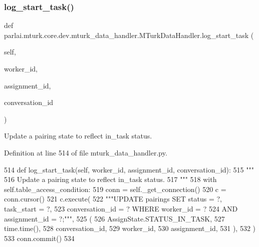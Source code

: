 \subsubsection{\texorpdfstring{log\+\_\+start\+\_\+task()}{log\_start\_task()}}
{\footnotesize\ttfamily def parlai.\+mturk.\+core.\+dev.\+mturk\+\_\+data\+\_\+handler.\+M\+Turk\+Data\+Handler.\+log\+\_\+start\+\_\+task (\begin{DoxyParamCaption}\item[{}]{self,  }\item[{}]{worker\+\_\+id,  }\item[{}]{assignment\+\_\+id,  }\item[{}]{conversation\+\_\+id }\end{DoxyParamCaption})}

\begin{DoxyVerb}Update a pairing state to reflect in_task status.
\end{DoxyVerb}
 

Definition at line 514 of file mturk\+\_\+data\+\_\+handler.\+py.


\begin{DoxyCode}
514     \textcolor{keyword}{def }log\_start\_task(self, worker\_id, assignment\_id, conversation\_id):
515         \textcolor{stringliteral}{"""}
516 \textcolor{stringliteral}{        Update a pairing state to reflect in\_task status.}
517 \textcolor{stringliteral}{        """}
518         with self.table\_access\_condition:
519             conn = self.\_get\_connection()
520             c = conn.cursor()
521             c.execute(
522                 \textcolor{stringliteral}{"""UPDATE pairings SET status = ?, task\_start = ?,}
523 \textcolor{stringliteral}{                         conversation\_id = ? WHERE worker\_id = ?}
524 \textcolor{stringliteral}{                         AND assignment\_id = ?;"""},
525                 (
526                     AssignState.STATUS\_IN\_TASK,
527                     time.time(),
528                     conversation\_id,
529                     worker\_id,
530                     assignment\_id,
531                 ),
532             )
533             conn.commit()
534 
\end{DoxyCode}
\mbox{\label{classparlai_1_1mturk_1_1core_1_1dev_1_1mturk__data__handler_1_1MTurkDataHandler_a5a9a1246250044f6f13117c899285c82}} 
